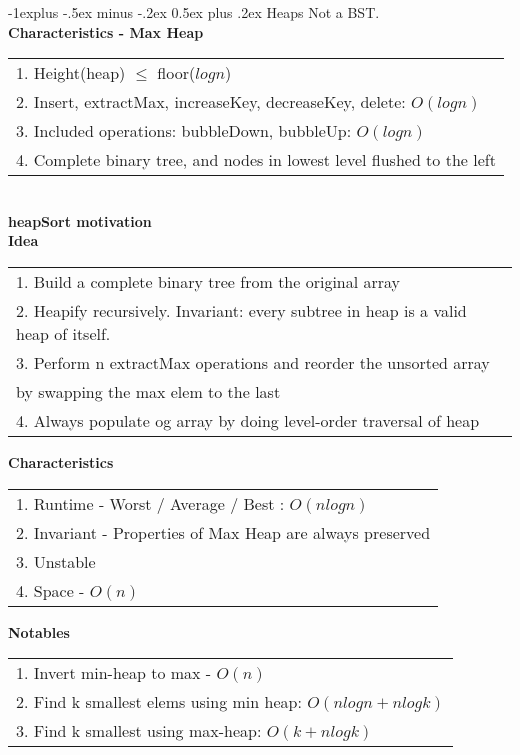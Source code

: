 \documentclass[10pt,landscape]{article}
\makeatletter
\renewcommand{\subsection}{\@startsection{subsection}{2}{0mm}%
                                {-1explus -.5ex minus -.2ex}%
                                {0.5ex plus .2ex}%
                                {\normalfont\normalsize\bfseries}}
\makeatother
\begin{document}
\begin{multicols}{3}
\subsection{Heaps} 
Not a BST. \\
\textbf{Characteristics - Max Heap} \\
\begin{tabular}{l} 
1. Height(heap) $\leq$ floor($logn$) \\ 
2. Insert, extractMax, increaseKey, decreaseKey, delete: $O(logn)$ \\
3. Included operations: bubbleDown, bubbleUp: $O(logn)$ \\ 
4. Complete binary tree, and nodes in lowest level flushed to the left 
\end{tabular} \\
\textbf{heapSort motivation} \\
\textbf{Idea} 
\begin{tabular}{l} 
1. Build a complete binary tree from the original array \\ 
2. Heapify recursively. Invariant: every subtree in heap is a valid heap of itself. \\ 
3. Perform n extractMax operations and reorder the unsorted array \\ by swapping the max elem to the last \\ 
4. Always populate og array by doing level-order traversal of heap 
\end{tabular}\textbf{}
\textbf{Characteristics} 
\begin{tabular}{l} 
1. Runtime - Worst / Average / Best : $O(nlogn)$ \\ 
2. Invariant - Properties of Max Heap are always preserved \\ 
3. Unstable \\
4. Space - $O(n)$
\end{tabular}
\textbf{Notables} 
\begin{tabular}{l} 
1. Invert min-heap to max - $O(n)$ \\
2. Find k smallest elems using min heap: $O(nlogn + nlogk)$ \\ 
3. Find k smallest using max-heap: $O(k + nlogk)$
\end{tabular}


\end{multicols}
\end{document}
